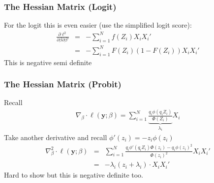 \documentclass[aspectratio=169]{beamer}
\begin{document}
\begin{frame}
\frametitle{The Hessian Matrix (Logit)}
For the logit this is even easier (use the simplified logit score):
\begin{eqnarray*}
\frac{\partial \ell^2 }{\partial \beta \partial \beta'}  &=& - \sum_{i=1}^N f(Z_i) X_i X_i' \\
&=& - \sum_{i=1}^N F(Z_i) (1- F(Z_i)) X_i X_i'
\end{eqnarray*}
This is \alert{negative semi definite}
\end{frame}

\begin{frame}
\frametitle{The Hessian Matrix (Probit)}
Recall
\begin{eqnarray*}
\nabla_{\beta} \cdot \ell(\mathbf{y}; \beta)= \sum_{i=1}^N \underbrace{\frac{ q_i \phi(q_i Z_i)}{\Phi(Z_i)}}_{\lambda_i} X_i
\end{eqnarray*}
Take another derivative and recall $\phi'(z_i) = - z_i \phi(z_i)$
\begin{eqnarray*}
\nabla_{\beta}^2 \cdot \ell(\mathbf{y}; \beta)&=& \sum_{i=1}^N \frac{q_i \phi'(q_i Z_i) \Phi(z_i) - q_i \phi(z_i)^2}{\Phi(z_i)^2}  X_i X_i' \\
&=& - \lambda_i( z_i + \lambda_i) \cdot X_i X_i'
\end{eqnarray*}
Hard to show but this is \alert{negative definite} too.
\end{frame}
\end{document}
